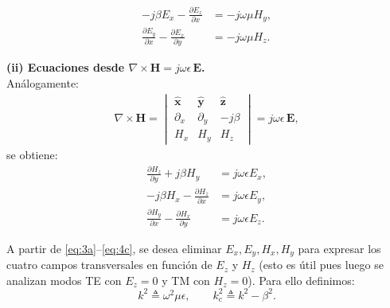 \documentclass[
  11pt,
  letterpaper,
   addpoints,
   answers
  ]{exam}
\begin{document}
\begin{questions}
\begin{parts}
\begin{solution}
\begin{minipage}[t]{0.485\linewidth}
\begin{align}
\label{eq:3a}\\
-j\beta E_x-\frac{\partial E_z}{\partial x}&=-j\omega\mu H_y,
\label{eq:3b}\\
\frac{\partial E_y}{\partial x}-\frac{\partial E_x}{\partial y}&=-j\omega\mu H_z.
\label{eq:3c}
\end{align}
\end{minipage}%
\hfill
\begin{minipage}[t]{0.485\linewidth}
\textbf{(ii) Ecuaciones desde $\nabla\times \mathbf{H}=j\omega\epsilon\,\mathbf{E}$.}\\[-2pt]
Análogamente:
\begin{align*}
\nabla\times\mathbf{H} =
\begin{vmatrix}
\hat{\mathbf{x}} & \hat{\mathbf{y}} & \hat{\mathbf{z}} \\[4pt]
\partial_x & \partial_y & -j\beta \\[4pt]
H_x & H_y & H_z
\end{vmatrix}
= j\omega\epsilon\,\mathbf{E},
\end{align*}
se obtiene:
\begin{align}
\frac{\partial H_z}{\partial y}+j\beta H_y&=j\omega\epsilon E_x,
\label{eq:4a}\\
-j\beta H_x-\frac{\partial H_z}{\partial x}&=j\omega\epsilon E_y,
\label{eq:4b}\\
\frac{\partial H_y}{\partial x}-\frac{\partial H_x}{\partial y}&=j\omega\epsilon E_z.
\label{eq:4c}
\end{align}
\end{minipage}

\vspace{6pt}
A partir de \eqref{eq:3a}--\eqref{eq:4c}, se desea eliminar $E_x,E_y,H_x,H_y$ para expresar los cuatro campos transversales en función de
$E_z$ y $H_z$ (esto es útil pues luego se analizan modos TE con $E_z=0$ y TM con $H_z=0$). Para ello definimos:
\begin{equation}
k^2 \triangleq \omega^2\mu\epsilon,
\qquad
k_c^2 \triangleq k^2-\beta^2.
\label{eq:defkc}
\end{equation}


\end{solution}
\end{parts}
\end{questions}
\end{document}
